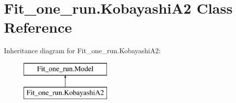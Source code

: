 \hypertarget{classFit__one__run_1_1KobayashiA2}{\section{\-Fit\-\_\-one\-\_\-run.\-Kobayashi\-A2 \-Class \-Reference}
\label{classFit__one__run_1_1KobayashiA2}
}
\-Inheritance diagram for \-Fit\-\_\-one\-\_\-run.\-Kobayashi\-A2\-:\begin{figure}[H]
\begin{center}
\leavevmode
\includegraphics[height=2.000000cm]{classFit__one__run_1_1KobayashiA2}
\end{center}
\end{figure}
